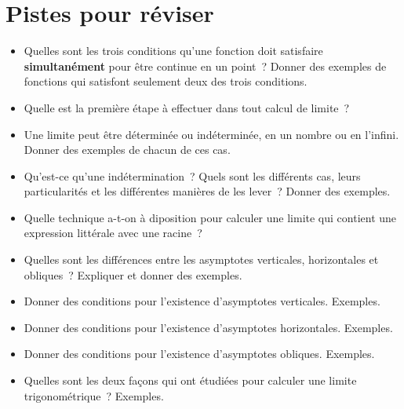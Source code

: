 \documentclass[a4paper,12pt]{article}
\begin{document}
\section{Pistes pour réviser}
\begin{itemize}
	\item Quelles sont les trois conditions qu'une fonction doit satisfaire {\bfseries simultanément} pour être continue en un point~? Donner des exemples de fonctions qui satisfont seulement deux des trois conditions.
	\item Quelle est la première étape à effectuer dans tout calcul de limite~?
	\item Une limite peut être déterminée ou indéterminée, en un nombre ou en l'infini. Donner des exemples de chacun de ces cas. 
	\item Qu'est-ce qu'une indétermination~? Quels sont les différents cas, leurs particularités et les différentes manières de les lever~? Donner des exemples.
	\item Quelle technique a-t-on à diposition pour calculer une limite qui contient une expression littérale avec une racine~?
	\item Quelles sont les différences entre les asymptotes verticales, horizontales et obliques~? Expliquer et donner des exemples.
	\item Donner des conditions pour l'existence d'asymptotes verticales. Exemples. 
	\item Donner des conditions pour l'existence d'asymptotes horizontales. Exemples.
	\item Donner des conditions pour l'existence d'asymptotes obliques. Exemples.
	\item Quelles sont les deux façons qui ont étudiées pour calculer une limite trigonométrique~? Exemples. 
\end{itemize}
 \nocite{*}
 \vspace{-10pt}
 \printbibliography[prenote=myprenote,title={Sources du cours}] 
\end{document}
